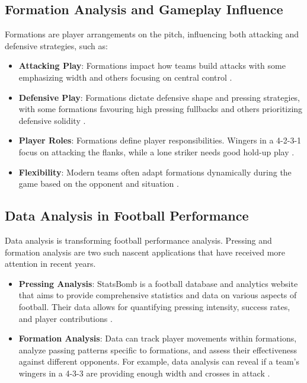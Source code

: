 \documentclass[12pt]{article}
\begin{document}
\subsection{Formation Analysis and Gameplay Influence}
Formations are player arrangements on the pitch, influencing both attacking and defensive strategies, such as:
\begin{itemize}
    \item \textbf{Attacking Play}: Formations impact how teams build attacks with some emphasizing width and others focusing on central control \cite{bauer2023putting}.
    \item \textbf{Defensive Play}: Formations dictate defensive shape and pressing strategies, with some formations favouring high pressing fullbacks and others prioritizing defensive solidity \cite{bauer2023putting}.
    \item \textbf{Player Roles}: Formations define player responsibilities. Wingers in a 4-2-3-1 focus on attacking the flanks, while a lone striker needs good hold-up play \cite{bauer2023putting}.
    \item \textbf{Flexibility}: Modern teams often adapt formations dynamically during the game based on the opponent and situation \cite{bauer2023putting}.
\end{itemize}

\subsection{Data Analysis in Football Performance}
Data analysis is transforming football performance analysis. Pressing and formation analysis are two such nascent applications that have received more attention in recent years.
\begin{itemize}
    \item \textbf{Pressing Analysis}: StatsBomb is a football database and analytics website that aims to provide comprehensive statistics and data on various aspects of football. Their data allows for quantifying pressing intensity, success rates, and player contributions \cite{counterstats2018}.
    \item \textbf{Formation Analysis}: Data can track player movements within formations, analyze passing patterns specific to formations, and assess their effectiveness against different opponents. For example, data analysis can reveal if a team's wingers in a 4-3-3 are providing enough width and crosses in attack \cite{goes2021unlocking}.
\end{itemize}
\end{document}
